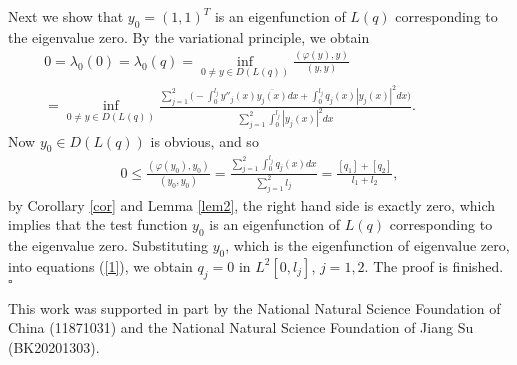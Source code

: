 \documentclass[reqno,11pt,centertags]{amsart}
\numberwithin{equation}{section}
\theoremstyle{definition}
\begin{document}
Next we show that $y_{0}=(1,1)^{T}$ is an eigenfunction of $L(q)$ corresponding to the eigenvalue zero. By the variational principle, we obtain
\begin{align}
0=\lambda_{0}(0)=\lambda_{0}(q)=\inf_{0\neq y\in D(L(q))}\frac{(\varphi(y),y)}{(y,y)} \qquad\qquad\qquad\qquad\quad\nonumber\\
=\inf_{0\neq y\in D(L(q))}\frac{\sum\limits_{j=1}^{2}\Big(-\int_{0}^{l_{j}}y''_{j}(x)\overline{y_{j}(x)}dx
+\int_{0}^{l_{j}}q_{j}(x)|y_{j}(x)|^{2}dx\Big)}{\sum\limits_{j=1}^{2}\int_{0}^{l_{j}}|y_{j}(x)|^{2}dx}.\!\!\!\!\!\nonumber
\end{align}
Now  $y_{0}\in D(L(q))$ is obvious, and so
\begin{align}
0\leq \frac{(\varphi(y_{0}),y_{0})}{(y_{0},y_{0})}=\frac{\sum\limits_{j=1}^{2}\int_{0}^{l_{j}}q_{j}(x)dx}{\sum\limits_{j=1}^{2}l_{j}}
=\frac{[q_{1}]+[q_{2}]}{l_{1}+l_{2}},\nonumber
\end{align}
by Corollary \ref{cor} and Lemma \ref{lem2}, the right hand side is exactly zero, which implies that the test function $y_{0}$ is an eigenfunction of $L(q)$ corresponding to the eigenvalue zero. Substituting $y_{0}$, which is the eigenfunction of eigenvalue zero, into equations (\ref{1}), we obtain $q_{j}=0$ in $L^{2}[0,l_{j}]$, $j=1,2$. The proof is finished. $\square$


\qquad
	
	This work was supported in part by  the National Natural Science Foundation of China (11871031) and the National Natural Science Foundation of Jiang Su (BK20201303).
	
\end{document}
